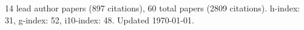 14 lead author papers (897 citations),
60 total papers (2809 citations).\newline
h-index: 31, g-index: 52, i10-index: 48. Updated \today.